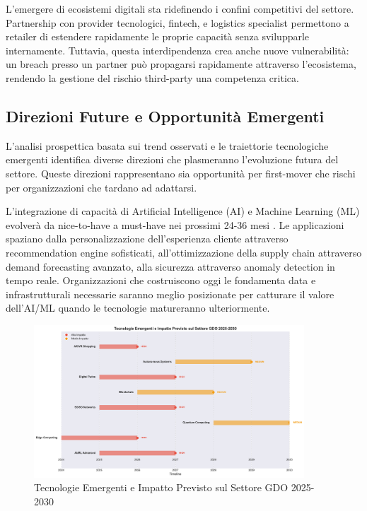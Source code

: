 L'emergere di ecosistemi digitali sta ridefinendo i confini competitivi del settore. Partnership con provider tecnologici, fintech, e logistics specialist permettono a retailer di estendere rapidamente le proprie capacità senza svilupparle internamente. Tuttavia, questa interdipendenza crea anche nuove vulnerabilità: un breach presso un partner può propagarsi rapidamente attraverso l'ecosistema, rendendo la gestione del rischio third-party una competenza critica.

\subsection{Direzioni Future e Opportunità Emergenti}

L'analisi prospettica basata sui trend osservati e le traiettorie tecnologiche emergenti identifica diverse direzioni che plasmeranno l'evoluzione futura del settore. Queste direzioni rappresentano sia opportunità per first-mover che rischi per organizzazioni che tardano ad adattarsi.

L'integrazione di capacità di Artificial Intelligence (AI) e Machine Learning (ML) evolverà da nice-to-have a must-have nei prossimi 24-36 mesi \autocite{williams2024aiml}. Le applicazioni spaziano dalla personalizzazione dell'esperienza cliente attraverso recommendation engine sofisticati, all'ottimizzazione della supply chain attraverso demand forecasting avanzato, alla sicurezza attraverso anomaly detection in tempo reale. Organizzazioni che costruiscono oggi le fondamenta data e infrastrutturali necessarie saranno meglio posizionate per catturare il valore dell'AI/ML quando le tecnologie matureranno ulteriormente.

\begin{figure}[htbp]
\centering
\includegraphics[width=0.9\textwidth]{thesis_figures/cap5/fig_5_4_tech_timeline.pdf}
\caption{Tecnologie Emergenti e Impatto Previsto sul Settore GDO 2025-2030}
\label{fig:tecnologie_future}
\end{figure}

